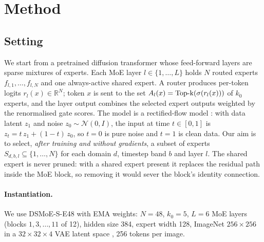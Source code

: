 \section{Method}\label{sec:method}

\subsection{Setting}
We start from a pretrained diffusion transformer \citep{peebles2023dit} whose feed-forward layers are sparse mixtures of experts.
Each MoE layer $l\in\{1,\dots,L\}$ holds $N$ routed experts $f_{l,1},\dots,f_{l,N}$ and one always-active shared expert.
A router produces per-token logits $r_l(x)\in\mathbb{R}^N$; token $x$ is sent to the set $A_l(x)=\operatorname{Top\text{-}k}(\sigma(r_l(x)))$ of $k_0$ experts, and the layer output combines the selected expert outputs weighted by the renormalised gate scores.
The model is a rectified-flow model \citep{liu2023rectifiedflow}: with data latent $z_1$ and noise $z_0\sim\mathcal{N}(0,I)$, the input at time $t\in[0,1]$ is $z_t=t\,z_1+(1-t)\,z_0$, so $t=0$ is pure noise and $t=1$ is clean data.
Our aim is to select, \emph{after training and without gradients}, a subset of experts $S_{d,b,l}\subseteq\{1,\dots,N\}$ for each domain $d$, timestep band $b$ and layer $l$.
The shared expert is never pruned: with a shared expert present it replaces the residual path inside the MoE block, so removing it would sever the block's identity connection.

\paragraph{Instantiation.}
We use DSMoE-S-E48 \citep{liu2025dsmoe} with EMA weights: $N=48$, $k_0=5$, $L=6$ MoE layers (blocks $1,3,\dots,11$ of 12), hidden size 384, expert width 128, ImageNet \citep{russakovsky2015imagenet} $256\times256$ in a $32\times32\times4$ VAE latent space \citep{rombach2022ldm}, 256 tokens per image. 

